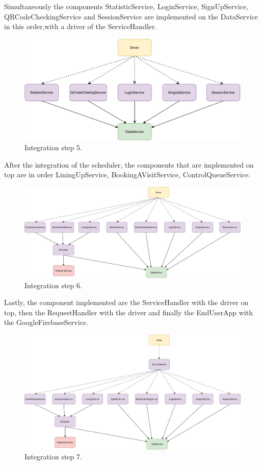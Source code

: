 Simultaneously the components StatisticService, LoginService, SignUpService, QRCodeCheckingService and SessionService are implemented on the DataService in this order,with a driver of the ServiceHandler.
\begin{figure}[H]
    \centering
    \includegraphics[width=1.0\textwidth]{images/component5.pdf}
    \caption{Integration step 5.}
\end{figure}
After the integration of the scheduler, the components that are implemented on top are in order LiningUpService, BookingAVisitService, ControlQueueService.
\begin{figure}[H]
    \centering
    \includegraphics[width=1.0\textwidth]{images/component6.pdf}
    \caption{Integration step 6.}
\end{figure}
Lastly, the component implemented are the ServiceHandler with the driver on top, then the RequestHandler with the driver and finally the EndUserApp with the GoogleFirebaseService.
\begin{figure}[H]
    \centering
    \includegraphics[width=1.0\textwidth]{images/component7.pdf}
    \caption{Integration step 7.}
\end{figure}
